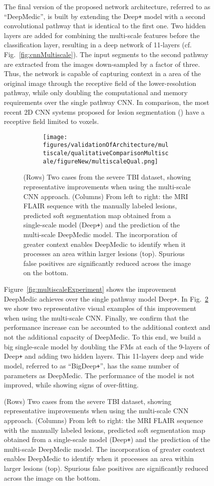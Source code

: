 \documentclass[preprint,authoryear,12pt]{elsarticle}
\newcommand{\quot}[1]{``#1''}
\begin{document}
\begin{figure}[h]
The final version of the proposed network architecture, referred to as \quot{DeepMedic}, is built by extending the Deep\texttt{+} model with a second convolutional pathway that is identical to the first one. Two hidden layers are added for combining the multi-scale features before the classification layer, resulting in a deep network of 11-layers (cf. Fig.~\ref{fig:cnnMultiscale}). The input segments to the second pathway are extracted from the images down-sampled by a factor of three. Thus, the network is capable of capturing context in a  area of the original image through the  receptive field of the lower-resolution pathway, while only doubling the computational and memory requirements over the single pathway CNN. In comparison, the most recent 2D CNN systems proposed for lesion segmentation (\cite{Havei2015Journal, pereira2015Brats}) have a receptive field limited to  voxels.

\begin{figure}[!h]
\centering
\begin{subfigure}[b]{0.85\textwidth}
\centering
	\texttt{[image: figures/validationOfArchitecture/multiscale/qualitativeComparisonMultiscale/figureNew/multiscaleQual.png]}
\end{subfigure}

\caption{(Rows) Two cases from the severe TBI dataset, showing representative improvements when using the multi-scale CNN approach. (Columns) From left to right: the MRI FLAIR sequence with the manually labeled lesions, predicted soft segmentation map obtained from a single-scale model (Deep\texttt{+}) and the prediction of the multi-scale DeepMedic model. The incorporation of greater context enables DeepMedic to identify when it processes an area within larger lesions (top). Spurious false positives are significantly reduced across the image on the bottom.}
\label{fig:qualitativeMultiscaleVal}
\end{figure}
%
 
Figure~\ref{fig:multiscaleExperiment} shows the improvement DeepMedic achieves over the single pathway model Deep\texttt{+}. In Fig.~\ref{fig:qualitativeMultiscaleVal} we show two representative visual examples of this improvement when using the multi-scale CNN. Finally, we confirm that the performance increase can be accounted to the additional context and not the additional capacity of DeepMedic. To this end, we build a big single-scale model by doubling the FMs at each of the 9-layers of Deep\texttt{+} and adding two hidden layers. This 11-layers deep and wide model, referred to as \quot{BigDeep\texttt{+}}, has the same number of parameters as DeepMedic. The performance of the model is not improved, while showing signs of over-fitting.


\end{figure}
\end{document}
